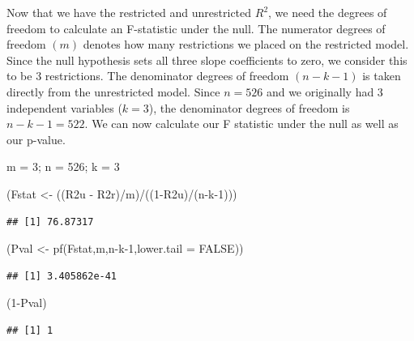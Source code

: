 \documentclass[
]{book}
\newenvironment{Shaded}{\begin{snugshade}}{\end{snugshade}}
\newcommand{\AttributeTok}[1]{\textcolor[rgb]{0.77,0.63,0.00}{#1}}
\newcommand{\ConstantTok}[1]{\textcolor[rgb]{0.00,0.00,0.00}{#1}}
\newcommand{\DecValTok}[1]{\textcolor[rgb]{0.00,0.00,0.81}{#1}}
\newcommand{\FunctionTok}[1]{\textcolor[rgb]{0.00,0.00,0.00}{#1}}
\newcommand{\NormalTok}[1]{#1}
\newcommand{\OtherTok}[1]{\textcolor[rgb]{0.56,0.35,0.01}{#1}}
\newcommand{\SpecialCharTok}[1]{\textcolor[rgb]{0.00,0.00,0.00}{#1}}
\begin{document}
Now that we have the restricted and unrestricted \(R^2\), we need the degrees of freedom to calculate an F-statistic under the null. The numerator degrees of freedom \((m)\) denotes how many restrictions we placed on the restricted model. Since the null hypothesis sets all three slope coefficients to zero, we consider this to be 3 restrictions. The denominator degrees of freedom \((n-k-1)\) is taken directly from the unrestricted model. Since \(n=526\) and we originally had 3 independent variables (\(k=3\)), the denominator degrees of freedom is \(n-k-1=522\). We can now calculate our F statistic under the null as well as our p-value.

\begin{Shaded}
\begin{Highlighting}[]
\NormalTok{m }\OtherTok{=} \DecValTok{3}\NormalTok{; n }\OtherTok{=} \DecValTok{526}\NormalTok{; k }\OtherTok{=} \DecValTok{3}

\NormalTok{(Fstat }\OtherTok{\textless{}{-}}\NormalTok{ ((R2u }\SpecialCharTok{{-}}\NormalTok{ R2r)}\SpecialCharTok{/}\NormalTok{m)}\SpecialCharTok{/}\NormalTok{((}\DecValTok{1}\SpecialCharTok{{-}}\NormalTok{R2u)}\SpecialCharTok{/}\NormalTok{(n}\SpecialCharTok{{-}}\NormalTok{k}\DecValTok{{-}1}\NormalTok{)))}
\end{Highlighting}
\end{Shaded}

\begin{verbatim}
## [1] 76.87317
\end{verbatim}

\begin{Shaded}
\begin{Highlighting}[]
\NormalTok{(Pval }\OtherTok{\textless{}{-}} \FunctionTok{pf}\NormalTok{(Fstat,m,n}\SpecialCharTok{{-}}\NormalTok{k}\DecValTok{{-}1}\NormalTok{,}\AttributeTok{lower.tail =} \ConstantTok{FALSE}\NormalTok{))}
\end{Highlighting}
\end{Shaded}

\begin{verbatim}
## [1] 3.405862e-41
\end{verbatim}

\begin{Shaded}
\begin{Highlighting}[]
\NormalTok{(}\DecValTok{1}\SpecialCharTok{{-}}\NormalTok{Pval)}
\end{Highlighting}
\end{Shaded}

\begin{verbatim}
## [1] 1
\end{verbatim}
\end{document}
